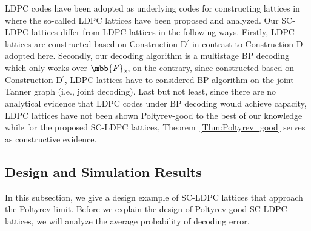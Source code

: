\documentclass[journal]{IEEEtran}
\begin{document}
\begin{Remark}
    LDPC codes have been adopted as underlying codes for constructing lattices in \cite{sadeghi06} where the so-called LDPC lattices have been proposed and analyzed. Our SC-LDPC lattices differ from LDPC lattices in the following ways. Firstly, LDPC lattices are constructed based on Construction D$^{\prime}$ \cite{BarnesSloane83} in contrast to Construction D adopted here. Secondly, our decoding algorithm is a multistage BP decoding which only works over $\mbb{F}_2$, on the contrary, since constructed based on Construction D$^{\prime}$, LDPC lattices have to considered BP algorithm on the joint Tanner graph \cite{Banihashemi01} (i.e., joint decoding). Last but not least, since there are no analytical evidence that LDPC codes under BP decoding would achieve capacity, LDPC lattices have not been shown Poltyrev-good to the best of our knowledge while for the proposed SC-LDPC lattices, Theorem~\ref{Thm:Poltyrev_good} serves as constructive evidence.
\end{Remark}


\subsection{Design and Simulation Results}
In this subsection, we give a design example of SC-LDPC lattices that approach the Poltyrev limit. Before we explain the design of Poltyrev-good SC-LDPC lattices, we will analyze the average probability of decoding error.
\end{document}
